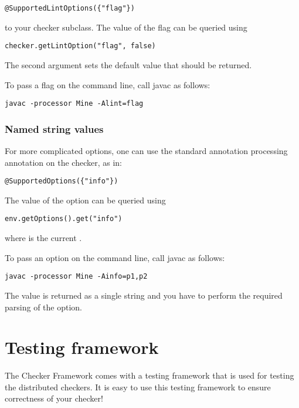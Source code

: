 \begin{Verbatim}
@SupportedLintOptions({"flag"})
\end{Verbatim}

to your checker subclass.
The value of the flag can be queried using

\begin{Verbatim}
checker.getLintOption("flag", false)
\end{Verbatim}

The second argument sets the default value that should be returned.

To pass a flag on the command line, call javac as follows:

\begin{Verbatim}
javac -processor Mine -Alint=flag
\end{Verbatim}


\subsubsection{Named string values}

For more complicated options, one can use the standard annotation
processing  annotation on the checker, as in:

\begin{Verbatim}
@SupportedOptions({"info"})
\end{Verbatim}

The value of the option can be queried using

\begin{Verbatim}
env.getOptions().get("info")
\end{Verbatim}

where  is the current .

To pass an option on the command line, call javac as follows:

\begin{Verbatim}
javac -processor Mine -Ainfo=p1,p2
\end{Verbatim}

The value is returned as a single string and you have to perform the
required parsing of the option.




\section{Testing framework\label{testing-framework}}

The Checker Framework comes with a testing framework that is used for
testing the distributed checkers.
It is easy to use this testing framework to ensure correctness of your
checker!

